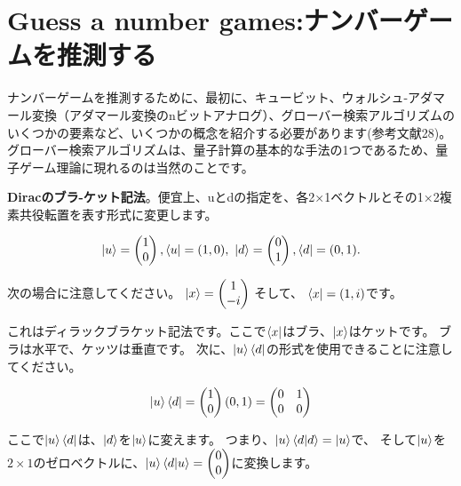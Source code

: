 \section{Guess a number games:ナンバーゲームを推測する}

ナンバーゲームを推測するために、最初に、キュービット、ウォルシュ-アダマール変換（アダマール変換のnビットアナログ）、グローバー検索アルゴリズムのいくつかの要素など、いくつかの概念を紹介する必要があります(参考文献28)。 グローバー検索アルゴリズムは、量子計算の基本的な手法の1つであるため、量子ゲーム理論に現れるのは当然のことです。

\textbf{Diracのブラ-ケット記法}。便宜上、uとdの指定を、各2×1ベクトルとその1×2複素共役転置を表す形式に変更します。

\begin{equation}
\label{35}
\ket{u} =
\begin{pmatrix}
1 \\
0  \\
\end{pmatrix}
,
\bra{u} = (1, 0)
,
\ 
\ket{d} =
\begin{pmatrix}
0 \\
1  \\
\end{pmatrix}
,
\bra{d} = (0, 1).
\end{equation}

次の場合に注意してください。
$\ket{x} =
\begin{pmatrix}
1 \\
-i  \\
\end{pmatrix} $
そして、
$\bra{x} = (1, i)$です。

これはディラックブラケット記法です。ここで$\bra{x}$はブラ、$\ket{x}$はケットです。
ブラは水平で、ケッツは垂直です。 次に、$\ket{u} \bra{d}$の形式を使用できることに注意してください。

\begin{equation}
\label{36}
\ket{u} \bra{d} =
\begin{pmatrix}
1 \\
0  \\
\end{pmatrix}
(0, 1)
=
\begin{pmatrix}
0 & 1\\
0 & 0  \\
\end{pmatrix}
\end{equation}

ここで$\ket{u} \bra{d}$は、$\ket{d}$を$\ket{u}$に変えます。 つまり、$\ket{u} \braket{d|d} = \ket{u}$で、 そして$\ket{u}$を$2×1$のゼロベクトルに、$\ket{u} \braket{d|u} =
\begin{pmatrix}
0 \\
0  \\
\end{pmatrix} $に変換します。


